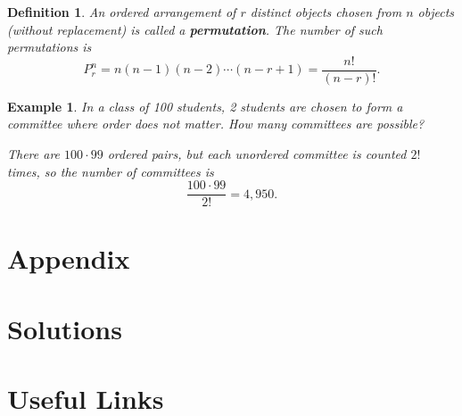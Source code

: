 \documentclass{article}
\newtheorem{definition}{Definition}
\newtheorem*{example}{Example}
\begin{document}
\begin{definition}
An ordered arrangement of $r$ distinct objects chosen from $n$ objects (without replacement) is called a \textbf{permutation}. The number of such permutations is
\[
P^n_r = n(n-1)(n-2) \cdots (n - r + 1) = \frac{n!}{(n-r)!}.
\]
\end{definition}

\begin{example}
In a class of 100 students, 2 students are chosen to form a committee where order does not matter. How many committees are possible?

There are $100 \cdot 99$ ordered pairs, but each unordered committee is counted $2!$ times, so the number of committees is
\[
\frac{100 \cdot 99}{2!} = 4{,}950.
\]
\end{example}

\section{Appendix}


\section{Solutions}


\section{Useful Links}
\end{document}
